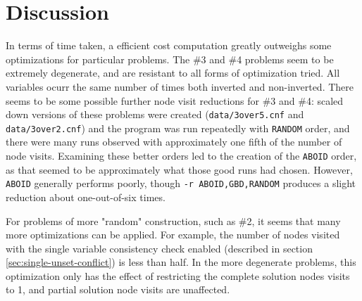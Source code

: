 \documentclass[10pt]{article}
\begin{document}
\section{Discussion}
In terms of time taken, a efficient cost computation greatly outweighs some optimizations for particular problems. The \#3 and \#4 problems seem to be extremely degenerate, and are resistant to all forms of optimization tried. All variables ocurr the same number of times both inverted and non-inverted. There seems to be some possible further node visit reductions for \#3 and \#4: scaled down versions of these problems were created (\texttt{data/3over5.cnf} and \texttt{data/3over2.cnf}) and the program was run repeatedly with \texttt{RANDOM} order, and there were many runs observed with approximately one fifth of the number of node visits. Examining these better orders led to the creation of the \texttt{ABOID} order, as that seemed to be approximately what those good runs had chosen. However, \texttt{ABOID} generally performs poorly, though \texttt{-r ABOID,GBD,RANDOM} produces a slight reduction about one-out-of-six times.

For problems of more "random" construction, such as \#2, it seems that many more optimizations can be applied. For example, the number of nodes visited with the single variable consistency check enabled (described in section \ref{sec:single-unset-conflict}) is less than half. In the more degenerate problems, this optimization only has the effect of restricting the complete solution nodes visits to 1, and partial solution node visits are unaffected.
\end{document}
